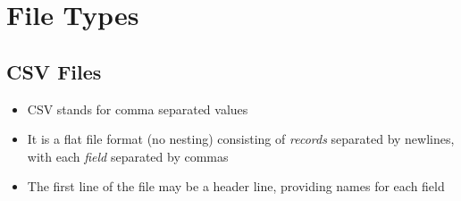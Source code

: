 \documentclass[a4paper]{article}
\begin{document}
\tableofcontents

\section{File Types}
\subsection{CSV Files}
\begin{itemize}
    \item CSV stands for comma separated values
    \item It is a flat file format (no nesting) consisting of \emph{records} separated by newlines, with each \emph{field} separated by commas
    \item The first line of the file may be a header line, providing names for each field
\end{itemize}
\end{document}
